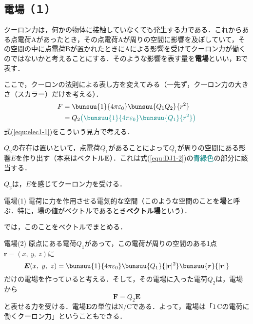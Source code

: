 \subsection{電場（１）}

クーロン力は，何かの物体に接触していなくても発生する力である．これからある点電荷Aがあったとき，その点電荷Aが周りの空間に影響を及ぼしていて，その空間の中に点電荷Bが置かれたときにAによる影響を受けてクーロン力が働くのではないかと考えることにする．そのような影響を表す量を\textbf{電場}といい，$\bm{E}$で表す．

ここで，クーロンの法則による表し方を変えてみる（一先ず，クーロン力の大きさ（スカラー）だけを考える）．
\begin{align}
	F &= \bunsuu{1}{4\pi\varepsilon_0}\bunsuu{Q_1 Q_2}{r^2} \notag\\
	&= Q_2 {\color{teal}\left(\bunsuu{1}{4\pi\varepsilon_0}\bunsuu{Q_1}{r^2}\right)} \label{equ:elec1-1}
\end{align}
式(\ref{equ:elec1-1})をこういう見方で考える．
\begin{enumerate}[label=\textbf{[\arabic*]}, labelsep=10pt, leftmargin=23pt]
	\item $Q_2$の存在は置いといて，点電荷$Q_1$があることによって$Q_1$が周りの空間にある影響$E$を作り出す（本来はベクトル$\bm{E}$）．これは式(\ref{equ:DJ1-2})の\textcolor{teal}{青緑色}の部分に該当する．
	\item $Q_2$は，$E$を感じてクーロン力を受ける．
\end{enumerate}

\begin{kousiki}{電場(1)}
	電荷に力を作用させる電気的な空間（このような空間のことを\textbf{場}と呼ぶ．特に，場の値がベクトルであるとき\textbf{ベクトル場}という）．
\end{kousiki}

では，このことをベクトルでまとめる．

\begin{kousiki}{電場(2)}
	原点にある電荷$Q_1$があって，この電荷が周りの空間のある1点$\bm{r} = (x,\ y,\ z)$に
	\begin{equation}
		\bm{E}(x,\ y,\ z) = \bunsuu{1}{4\pi\varepsilon_0}\bunsuu{Q_1}{|\bm{r}|^2}\bunsuu{\bm{r}}{|\bm{r}|} \label{equ:elec1-2}
	\end{equation}
	だけの電場を作っていると考える．そして，その電場に入った電荷$Q_2$は，電場から
	\begin{equation}
		\bm{F} = Q_2 \bm{E}
	\end{equation}
	と表せる力を受ける．電場$\bm{E}$の単位は$\mathrm{N/C}$である．よって，電場は「$1\,\mathrm{C}$の電荷に働くクーロン力」ということもできる．
\end{kousiki}

